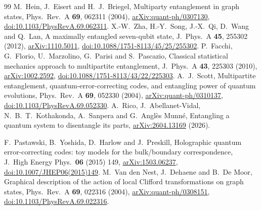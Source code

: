 \documentclass[11pt]{article}
\begin{document}
\begin{thebibliography}{99}
 M.~Hein, J.~Eisert and H.~J.~Briegel, Multiparty entanglement in graph states, Phys.\
Rev.\ A \textbf{69}, 062311 (2004), \href{https://arxiv.org/abs/quant-ph/0307130}{arXiv:quant-ph/0307130}, \href{https://doi.org/10.1103/PhysRevA.69.062311}{doi:10.1103/PhysRevA.69.062311}.
\bibitem{Zha11} X.-W.~Zha, H.-Y.~Song, J.-X.~Qi, D.~Wang and Q.~Lan, A maximally entangled
seven-qubit state, J.\ Phys.\ A \textbf{45}, 255302 (2012),
\href{https://arxiv.org/abs/1110.5011}{arXiv:1110.5011}, \href{https://doi.org/10.1088/1751-8113/45/25/255302}{doi:10.1088/1751-8113/45/25/255302}.
\bibitem{Facchi} P.~Facchi, G.~Florio, U.~Marzolino, G.~Parisi and S.~Pascazio, Classical statistical
mechanics approach to multipartite entanglement, J.\ Phys.\ A \textbf{43}, 225303 (2010),
\href{https://arxiv.org/abs/1002.2592}{arXiv:1002.2592}, \href{https://doi.org/10.1088/1751-8113/43/22/225303}{doi:10.1088/1751-8113/43/22/225303}.
\bibitem{Scott} A.~J.~Scott, Multipartite entanglement, quantum-error-correcting codes, and entangling power of
quantum evolutions, Phys.\ Rev.\ A \textbf{69}, 052330 (2004),
\href{https://arxiv.org/abs/quant-ph/0310137}{arXiv:quant-ph/0310137}, \href{https://doi.org/10.1103/PhysRevA.69.052330}{doi:10.1103/PhysRevA.69.052330}.
\bibitem{Rico} A.~Rico, J.~Abellanet-Vidal, N.~B.~T.~Kothakonda, A.~Sanpera and G.~Angl\`es Munn\'e,
Entangling a quantum system to disentangle its parts,
\href{https://arxiv.org/abs/2604.13169}{arXiv:2604.13169} (2026).

 F.~Pastawski, B.~Yoshida, D.~Harlow and J.~Preskill, Holographic quantum error-correcting codes: toy
models for the bulk/boundary correspondence, J.\ High Energy Phys.\ \textbf{06} (2015) 149,
\href{https://arxiv.org/abs/1503.06237}{arXiv:1503.06237}, \href{https://doi.org/10.1007/JHEP06(2015)149}{doi:10.1007/JHEP06(2015)149}.
\bibitem{VdN} M.~Van den Nest, J.~Dehaene and B.~De Moor, Graphical description of the action of local Clifford
transformations on graph states, Phys.\ Rev.\ A \textbf{69}, 022316 (2004),
\href{https://arxiv.org/abs/quant-ph/0308151}{arXiv:quant-ph/0308151}, \href{https://doi.org/10.1103/PhysRevA.69.022316}{doi:10.1103/PhysRevA.69.022316}.


\end{thebibliography}
\end{document}
